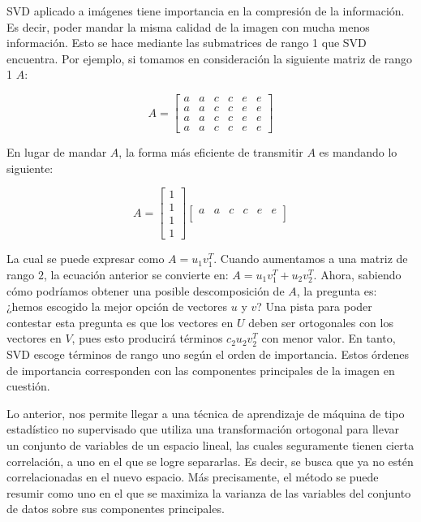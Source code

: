 \documentclass[conference]{IEEEtran}
\begin{document}
SVD aplicado a imágenes tiene importancia en la compresión de la información. Es decir, poder mandar la misma calidad de la imagen con mucha menos información. Esto se hace mediante las submatrices de rango 1 que SVD encuentra. Por ejemplo, si tomamos en consideración la siguiente matriz de rango 1 $A$:

\begin{equation*}
    A = \begin{bmatrix}
        a & a & c & c & e & e \\
        a & a & c & c & e & e \\
        a & a & c & c & e & e \\
        a & a & c & c & e & e
    \end{bmatrix}
\end{equation*}

En lugar de mandar $A$, la forma más eficiente de transmitir $A$ es mandando lo siguiente: 

\begin{equation*}
    A = 
\begin{bmatrix}
    1 \\ 1 \\ 1 \\ 1
\end{bmatrix}
\begin{bmatrix}
    a & a & c & c & e & e \\
\end{bmatrix}
\end{equation*}

La cual se puede expresar como $A = u_1v_1^T$. Cuando aumentamos a una matriz de rango $2$, la ecuación anterior se convierte en: $A = u_1v_1^T + u_2v_2^T$. Ahora, sabiendo cómo podríamos obtener una posible descomposición de $A$, la pregunta es: ¿hemos escogido la mejor opción de vectores $u$ y $v$? Una pista para poder contestar esta pregunta es que los vectores en $U$ deben ser ortogonales con los vectores en $V$, pues esto producirá términos $c_2u_2v_2^T$ con menor valor. En tanto, SVD escoge términos de rango uno según el orden de importancia. Estos órdenes de importancia corresponden con las componentes principales de la imagen en cuestión.

Lo anterior, nos permite llegar a una técnica de aprendizaje de máquina de tipo estadístico no supervisado que utiliza una transformación ortogonal para llevar un conjunto de variables de un espacio lineal, las cuales seguramente tienen cierta correlación, a uno en el que se logre separarlas. Es decir, se busca que ya no estén correlacionadas en el nuevo espacio. Más precisamente, el método se puede resumir como uno en el que se maximiza la varianza de las variables del conjunto de datos sobre sus componentes principales.
\end{document}
